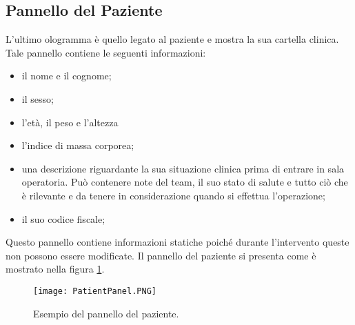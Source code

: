 \subsection{Pannello del Paziente}
L'ultimo ologramma è quello legato al paziente e mostra la sua cartella clinica. Tale pannello contiene le seguenti informazioni:
\begin{itemize}
    \item il nome e il cognome;
    \item il sesso;
    \item l'età, il peso e l'altezza
    \item l'indice di massa corporea;
    \item una descrizione riguardante la sua situazione clinica prima di entrare in sala operatoria. Può contenere note del team, il suo stato di salute e tutto ciò che è rilevante e da tenere in considerazione quando si effettua l'operazione;
    \item il suo codice fiscale;
\end{itemize}

Questo pannello contiene informazioni statiche poiché durante l'intervento queste non possono essere modificate. Il pannello del paziente si presenta come è mostrato nella figura \ref{pic:patient-panel}.

\begin{figure}[ht]
    \texttt{[image: PatientPanel.PNG]}
    \centering
    \caption{\label{pic:patient-panel}Esempio del pannello del paziente.}
\end{figure}